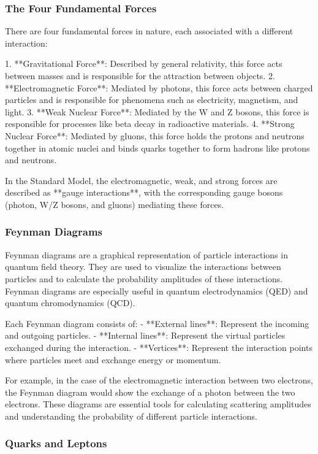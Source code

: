 \documentclass{article}
\begin{document}
\subsubsection*{The Four Fundamental Forces}

There are four fundamental forces in nature, each associated with a different interaction:

1. **Gravitational Force**: Described by general relativity, this force acts between masses and is responsible for the attraction between objects.
2. **Electromagnetic Force**: Mediated by photons, this force acts between charged particles and is responsible for phenomena such as electricity, magnetism, and light.
3. **Weak Nuclear Force**: Mediated by the W and Z bosons, this force is responsible for processes like beta decay in radioactive materials.
4. **Strong Nuclear Force**: Mediated by gluons, this force holds the protons and neutrons together in atomic nuclei and binds quarks together to form hadrons like protons and neutrons.

In the Standard Model, the electromagnetic, weak, and strong forces are described as **gauge interactions**, with the corresponding gauge bosons (photon, W/Z bosons, and gluons) mediating these forces.

\subsubsection*{Feynman Diagrams}

Feynman diagrams are a graphical representation of particle interactions in quantum field theory. They are used to visualize the interactions between particles and to calculate the probability amplitudes of these interactions. Feynman diagrams are especially useful in quantum electrodynamics (QED) and quantum chromodynamics (QCD).

Each Feynman diagram consists of:
- **External lines**: Represent the incoming and outgoing particles.
- **Internal lines**: Represent the virtual particles exchanged during the interaction.
- **Vertices**: Represent the interaction points where particles meet and exchange energy or momentum.

For example, in the case of the electromagnetic interaction between two electrons, the Feynman diagram would show the exchange of a photon between the two electrons. These diagrams are essential tools for calculating scattering amplitudes and understanding the probability of different particle interactions.

\subsubsection*{Quarks and Leptons}
\end{document}
